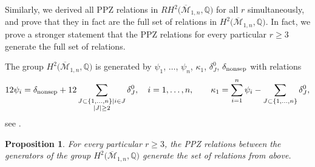 \documentclass[10pt,a4paper]{amsart}
\def\oM{\overline{\mathcal{M}}}
\numberwithin{equation}{section}
\newtheorem{Proposition}[Theorem]{Proposition}
 { \theoremstyle{definition}
\newtheorem{Definition}[Theorem]{Definition}
\newtheorem{Note}[Theorem]{Note}
\newtheorem{Example}[Theorem]{Example}
\newtheorem{Remark}[Theorem]{Remark} }
\begin{document}
Similarly, we derived all PPZ relations in $RH^2\big(\oM_{1,n},\mathbb{Q}\big)$ for all $r$ simultaneously, and prove that they in fact are the full set of relations in $H^2\big(\oM_{1,n},\mathbb{Q}\big)$. In fact, we prove a stronger statement that the PPZ relations for every particular $r\geq3$ generate the full set of relations.

The group $H^2\big(\oM_{1,n},\mathbb{Q}\big)$ is generated by
$\psi_1$, $\dots$, $\psi_n$, $\kappa_1$, $\delta^{0}_{J}$, $\delta_{\rm nonsep}$ with relations
\begin{gather}
12\psi_i = \delta_{\rm nonsep} + 12\sum_{\substack{J\subset \{1,\dots,n\}|i\in J \\ |J|\geq 2}} \delta^{0}_{J}, \quad i=1,\dots,n,\qquad
 \kappa_1 = \sum^{n}_{i=1}\psi_i - \sum_{J\subset \{1,\dots,n\}}\delta^{0}_{J},\label{genus1}
\end{gather}
see \cite[Theorem 2.2]{Cor}.

\begin{Proposition}
For every particular $r\geq3$, the PPZ relations between the generators of the group $H^2\big(\oM_{1,n},\mathbb{Q}\big)$ generate the set of relations from above.
\end{Proposition}
\end{document}

